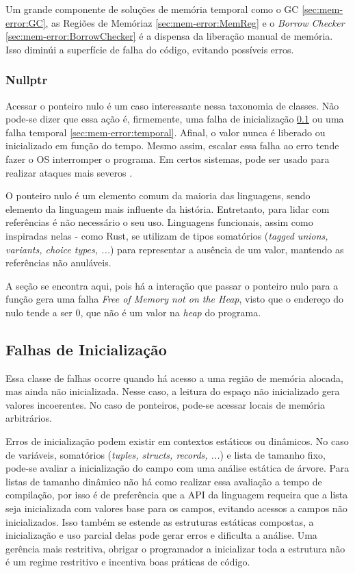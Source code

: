Um grande componente de soluções de memória temporal como o GC \ref{sec:mem-error:GC}, as Regiões de Memóriaz \ref{sec:mem-error:MemReg} e o \emph{Borrow Checker} \ref{sec:mem-error:BorrowChecker} é a dispensa da liberação manual de memória. Isso diminúi a superfície de falha do código, evitando possíveis erros.

\subsubsection{Nullptr}

Acessar o ponteiro nulo é um caso interessante nessa taxonomia de classes. Não pode-se dizer que essa ação é, firmemente, uma falha de inicialização \ref{sec:mem-error:init} ou uma falha temporal \ref{sec:mem-error:temporal}. Afinal, o valor nunca é liberado ou inicializado em função do tempo. Mesmo assim, escalar essa falha ao erro tende fazer o OS interromper o programa. Em certos sistemas, pode ser usado para realizar ataques mais severos \cite[p.4]{MemErrorPastPresentFuture}.

O ponteiro nulo é um elemento comum da maioria das linguagens, sendo elemento da linguagem mais influente da história. Entretanto, para lidar com referências é não necessário o seu uso. Linguagens funcionais, assim como inspiradas nelas - como Rust, se utilizam de tipos somatórios (\emph{tagged unions, variants, choice types, ...}) para representar a ausência de um valor, mantendo as referências não anuláveis.

A seção se encontra aqui, pois há a interação que passar o ponteiro nulo para a função \FREE gera uma falha \emph{Free of Memory not on the Heap}, visto que o endereço do nulo tende a ser 0, que não é um valor na \emph{heap} do programa.


\subsection{Falhas de Inicialização}
\label{sec:mem-error:init}

Essa classe de falhas ocorre quando há acesso a uma região de memória alocada, mas ainda não inicializada. Nesse caso, a leitura do espaço não inicializado gera valores incoerentes. No caso de ponteiros, pode-se acessar locais de memória arbitrários.

Erros de inicialização podem existir em contextos estáticos ou dinâmicos. No caso de variáveis, somatórios (\emph{tuples, structs, records, ...}) e lista de tamanho fixo, pode-se avaliar a inicialização do campo com uma análise estática de árvore. Para listas de tamanho dinâmico não há como realizar essa avaliação a tempo de compilação, por isso é de preferência que a API da linguagem requeira que a lista seja inicializada com valores base para os campos, evitando acessos a campos não inicializados. Isso também se estende as estruturas estáticas compostas, a inicialização e uso parcial delas pode gerar erros e dificulta a análise. Uma gerência mais restritiva, obrigar o programador a inicializar toda a estrutura não é um regime restritivo e incentiva boas práticas de código.

